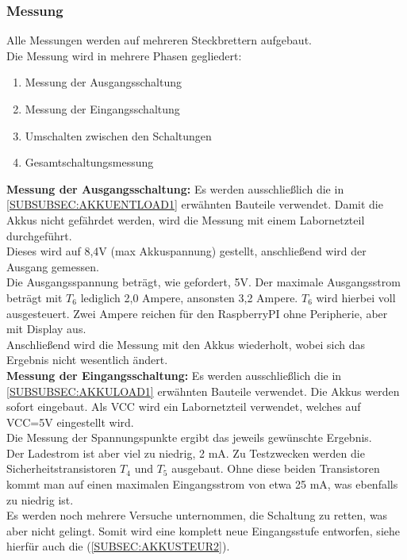 \documentclass[12pt,a4paper]{article}
\begin{document}
\newpage
\subsubsection{Messung}
\label{SUBSUBSEC:MEASUREMENT1}

Alle Messungen werden auf mehreren Steckbrettern aufgebaut. \\
Die Messung wird in mehrere Phasen gegliedert:
\begin{enumerate}
	\item{Messung der Ausgangsschaltung}
	\item{Messung der Eingangsschaltung}
	\item{Umschalten zwischen den Schaltungen}
	\item{Gesamtschaltungsmessung}
\end{enumerate}
\textbf{Messung der Ausgangsschaltung:}  Es werden ausschließlich die in \ref{SUBSUBSEC:AKKUENTLOAD1} erwähnten Bauteile verwendet. Damit die Akkus nicht gefährdet werden, wird die Messung mit einem Labornetzteil durchgeführt. \\
Dieses wird auf 8,4V (max Akkuspannung) gestellt, anschließend wird der Ausgang gemessen. \\
Die Ausgangsspannung beträgt, wie gefordert, 5V.
Der maximale Ausgangsstrom beträgt mit $T_6$ lediglich 2,0 Ampere, ansonsten 3,2 Ampere. $T_6$ wird hierbei voll ausgesteuert. Zwei Ampere reichen für den RaspberryPI ohne Peripherie, aber mit Display aus. \\
Anschließend wird die Messung mit den Akkus wiederholt, wobei sich das Ergebnis nicht wesentlich ändert.\\[2ex]
\textbf{Messung der Eingangsschaltung:} Es werden ausschließlich die in \ref{SUBSUBSEC:AKKULOAD1} erwähnten Bauteile verwendet. Die Akkus werden sofort eingebaut. Als VCC wird ein Labornetzteil verwendet, welches auf VCC=5V eingestellt wird. \\
Die Messung der Spannungspunkte ergibt das jeweils gewünschte Ergebnis. \\
Der Ladestrom ist aber viel zu niedrig, 2 mA. Zu Testzwecken werden die Sicherheitstransistoren $T_4$ und $T_5$ ausgebaut. Ohne diese beiden Transistoren kommt man auf einen maximalen Eingangsstrom von etwa 25 mA, was ebenfalls zu niedrig ist. \\
Es werden noch mehrere Versuche unternommen, die Schaltung zu retten, was aber nicht gelingt. Somit wird eine komplett neue Eingangsstufe entworfen, siehe hierfür auch die  (\ref{SUBSEC:AKKUSTEUR2}).
\end{document}
